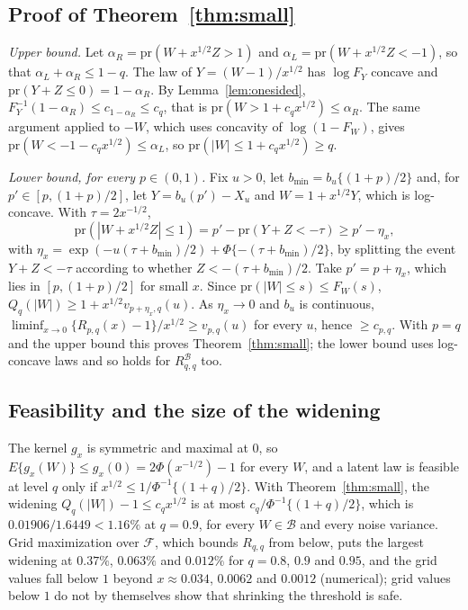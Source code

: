 \documentclass[12pt]{article}
\renewcommand{\_}{\usc\allowbreak}
\theoremstyle{definition}
\numberwithin{equation}{section}
\newcommand{\pr}{\mathrm{pr}}
\newcommand{\B}{\mathcal{B}}
\begin{document}
\subsection{Proof of Theorem~\ref{thm:small}}\label{sec:s-small}

\emph{Upper bound.} Let $\alpha_R = \pr(W + x^{1/2}Z > 1)$ and $\alpha_L = \pr(W + x^{1/2}Z < -1)$, so that $\alpha_L + \alpha_R \le 1 - q$. The law of $Y = (W - 1)/x^{1/2}$ has $\log F_Y$ concave and $\pr(Y + Z \le 0) = 1 - \alpha_R$. By Lemma~\ref{lem:onesided}, $F_Y^{-1}(1 - \alpha_R) \le c_{1 - \alpha_R} \le c_q$, that is $\pr(W > 1 + c_qx^{1/2}) \le \alpha_R$. The same argument applied to $-W$, which uses concavity of $\log(1 - F_W)$, gives $\pr(W < -1 - c_qx^{1/2}) \le \alpha_L$, so $\pr(|W| \le 1 + c_qx^{1/2}) \ge q$.

\emph{Lower bound, for every $p \in (0, 1)$.} Fix $u > 0$, let $b_{\min} = b_u\{(1 + p)/2\}$ and, for $p' \in [p, (1 + p)/2]$, let $Y = b_u(p') - X_u$ and $W = 1 + x^{1/2}Y$, which is log-concave. With $\tau = 2x^{-1/2}$,
\[
\pr(|W + x^{1/2}Z| \le 1) = p' - \pr(Y + Z < -\tau) \ge p' - \eta_x,
\]
with $\eta_x = \exp(-u(\tau + b_{\min})/2) + \Phi\{-(\tau + b_{\min})/2\}$,
by splitting the event $Y + Z < -\tau$ according to whether $Z < -(\tau + b_{\min})/2$. Take $p' = p + \eta_x$, which lies in $[p, (1 + p)/2]$ for small $x$. Since $\pr(|W| \le s) \le F_W(s)$, $Q_q(|W|) \ge 1 + x^{1/2}v_{p + \eta_x, q}(u)$. As $\eta_x \to 0$ and $b_u$ is continuous, $\liminf_{x\to0}\{R_{p,q}(x) - 1\}/x^{1/2} \ge v_{p,q}(u)$ for every $u$, hence $\ge c_{p,q}$. With $p = q$ and the upper bound this proves Theorem~\ref{thm:small}; the lower bound uses log-concave laws and so holds for $R^{\B}_{q,q}$ too.

\subsection{Feasibility and the size of the widening}\label{sec:s-feasible}

The kernel $g_x$ is symmetric and maximal at $0$, so $E\{g_x(W)\} \le g_x(0) = 2\Phi(x^{-1/2}) - 1$ for every $W$, and a latent law is feasible at level $q$ only if $x^{1/2} \le 1/\Phi^{-1}\{(1 + q)/2\}$. With Theorem~\ref{thm:small}, the widening $Q_q(|W|) - 1 \le c_qx^{1/2}$ is at most $c_q/\Phi^{-1}\{(1 + q)/2\}$, which is $0.01906/1.6449 < 1.16\%$ at $q = 0.9$, for every $W \in \B$ and every noise variance. Grid maximization over $\mathcal F$, which bounds $R_{q,q}$ from below, puts the largest widening at $0.37\%$, $0.063\%$ and $0.012\%$ for $q = 0.8$, $0.9$ and $0.95$, and the grid values fall below $1$ beyond $x \approx 0.034$, $0.0062$ and $0.0012$ (numerical); grid values below $1$ do not by themselves show that shrinking the threshold is safe.
\end{document}
